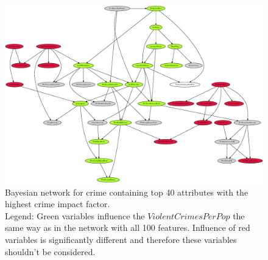 \begin{hugepage}
\pdfpagewidth
\begin{figure}[h]
    \centering
    \vspace*{-2.5cm}
    \includegraphics[scale=0.834]{fig/top-40_intersection_tolerance-1}
    \caption{Bayesian network for crime containing top 40 attributes with the highest crime impact factor.
    \\Legend: Green variables influence the $ViolentCrimesPerPop$ the same way as in the network with all 100 features. Influence of red variables is significantly different and therefore these variables shouldn't be considered.}
    \label{fig:crime_net_top40}
\end{figure}
\end{hugepage}

